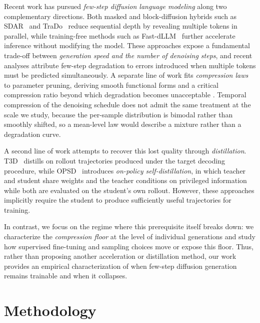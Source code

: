 \documentclass{article}
\begin{document}
Recent work has pursued \textit{few-step diffusion language modeling} along two complementary directions. Both masked and block-diffusion hybrids such as SDAR~\citep{cheng2025sdar} and TraDo~\citep{wang2025tracerl} reduce sequential depth by revealing multiple tokens in parallel, while training-free methods such as Fast-dLLM~\citep{wu2025fastdllm} further accelerate inference without modifying the model. These approaches expose a fundamental trade-off between \textit{generation speed and the number of denoising steps}, and recent analyses attribute few-step degradation to errors introduced when multiple tokens must be predicted simultaneously. A separate line of work fits \emph{compression laws} to parameter pruning, deriving smooth functional forms and a critical compression ratio beyond which degradation becomes unacceptable \citep{sengupta2025compression}. Temporal compression of the denoising schedule does not admit the same treatment at the scale we study, because the per-sample distribution is bimodal rather than smoothly shifted, so a mean-level law would describe a mixture rather than a degradation curve.

A second line of work attempts to recover this lost quality through \textit{distillation}. T3D~\citep{zhang2026t3d} distills on rollout trajectories produced under the target decoding procedure, while OPSD~\citep{zhao2026opsd} introduces \textit{on-policy self-distillation}, in which teacher and student share weights and the teacher conditions on privileged information while both are evaluated on the student's own rollout. However, these approaches implicitly require the student to produce sufficiently useful trajectories for training.

In contrast, we focus on the regime where this prerequisite itself breaks down: we characterize the \textit{compression floor} at the level of individual generations and study how supervised fine-tuning and sampling choices move or expose this floor. Thus, rather than proposing another acceleration or distillation method, our work provides an empirical characterization of when few-step diffusion generation remains trainable and when it collapses.

\section{Methodology}
\end{document}

